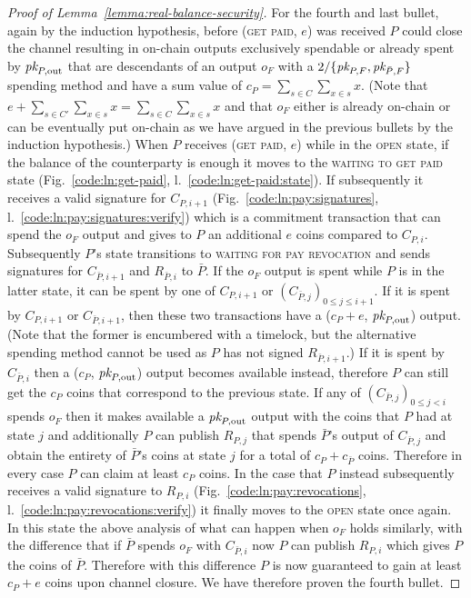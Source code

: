 \begin{proof}[Proof of Lemma~\ref{lemma:real-balance-security}]
  For the fourth and last bullet, again by the induction hypothesis, before
  (\textsc{get paid}, $e$) was received $P$ could close the channel resulting in
  on-chain outputs exclusively spendable or already spent by $\textit{pk}_{P,
  \mathrm{out}}$ that are descendants of an output $o_F$ with a $2/\{\textit{pk}_{P, F},
  \textit{pk}_{\bar{P}, F}\}$ spending method and have a sum value of $c_P =
  \sum\limits_{s \in C} \sum\limits_{x \in s} x$. (Note that $e + \sum\limits_{s
  \in C'} \sum\limits_{x \in s} x = \sum\limits_{s \in C} \sum\limits_{x \in s}
  x$ and that $o_F$ either is already on-chain or can be eventually put on-chain
  as we have argued in the previous bullets by the induction hypothesis.) When
  $P$ receives (\textsc{get paid}, $e$) while in the \textsc{open} state, if the
  balance of the counterparty is enough it moves to the \textsc{waiting to get
  paid} state (Fig.~\ref{code:ln:get-paid}, l.~\ref{code:ln:get-paid:state}). If
  subsequently it receives a valid signature for $C_{P, i+1}$
  (Fig.~\ref{code:ln:pay:signatures}, l.~\ref{code:ln:pay:signatures:verify})
  which is a commitment transaction that can spend the $o_F$ output and gives to
  $P$ an additional $e$ coins compared to $C_{P, i}$. Subsequently $P$'s state
  transitions to \textsc{waiting for pay revocation} and sends signatures for
  $C_{\bar{P}, i+1}$ and $R_{\bar{P}, i}$ to $\bar{P}$. If the $o_F$ output is
  spent while $P$ is in the latter state, it can be spent by one of $C_{P, i+1}$
  or $(C_{\bar{P}, j})_{0 \leq j \leq i+1}$. If it is spent by $C_{P, i+1}$ or
  $C_{\bar{P}, i+1}$, then these two transactions have a ($c_P + e$, $\textit{pk}_{P,
  \mathrm{out}}$) output. (Note that the former is encumbered with a timelock,
  but the alternative spending method cannot be used as $P$ has not signed
  $R_{\bar{P}, i+1}$.) If it is spent by $C_{\bar{P}, i}$ then a ($c_P$, $\textit{pk}_{P,
  \mathrm{out}}$) output becomes available instead, therefore $P$ can still get
  the $c_P$ coins that correspond to the previous state. If any of $(C_{\bar{P},
  j})_{0 \leq j < i}$ spends $o_F$ then it makes available a $\textit{pk}_{P,
  \mathrm{out}}$ output with the coins that $P$ had at state $j$ and
  additionally $P$ can publish $R_{P, j}$ that spends $\bar{P}$'s output of
  $C_{\bar{P}, j}$ and obtain the entirety of $\bar{P}$'s coins at state $j$ for
  a total of $c_P + c_{\bar{P}}$ coins.  Therefore in every case $P$ can claim
  at least $c_P$ coins. In the case that $P$ instead subsequently receives a
  valid signature to $R_{P, i}$ (Fig.~\ref{code:ln:pay:revocations},
  l.~\ref{code:ln:pay:revocations:verify}) it finally moves to the \textsc{open}
  state once again. In this state the above analysis of what can happen when
  $o_F$ holds similarly, with the difference that if $\bar{P}$ spends $o_F$ with
  $C_{\bar{P}, i}$ now $P$ can publish $R_{P, i}$ which gives $P$ the coins of
  $\bar{P}$. Therefore with this difference $P$ is now guaranteed to gain at
  least $c_P + e$ coins upon channel closure. We have therefore proven the
  fourth bullet.
\end{proof}
